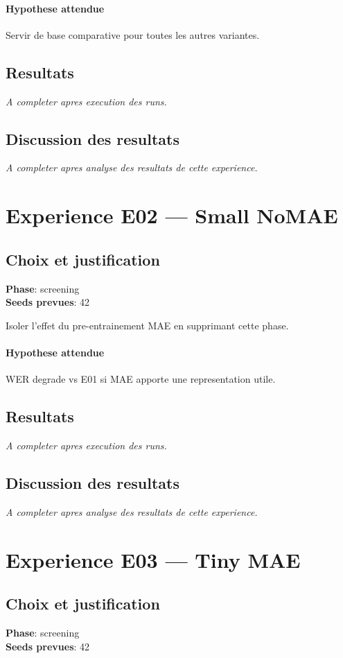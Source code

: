 \documentclass[11pt,a4paper]{article}
\begin{document}
\paragraph{Hypothese attendue}
Servir de base comparative pour toutes les autres variantes.

\subsection{Resultats}
\textit{A completer apres execution des runs.}

\subsection{Discussion des resultats}
\textit{A completer apres analyse des resultats de cette experience.}


\section{Experience E02 --- Small NoMAE}
\subsection{Choix et justification}
\textbf{Phase}: screening\\
\textbf{Seeds prevues}: 42

Isoler l'effet du pre-entrainement MAE en supprimant cette phase.

\paragraph{Hypothese attendue}
WER degrade vs E01 si MAE apporte une representation utile.

\subsection{Resultats}
\textit{A completer apres execution des runs.}

\subsection{Discussion des resultats}
\textit{A completer apres analyse des resultats de cette experience.}


\section{Experience E03 --- Tiny MAE}
\subsection{Choix et justification}
\textbf{Phase}: screening\\
\textbf{Seeds prevues}: 42
\end{document}

